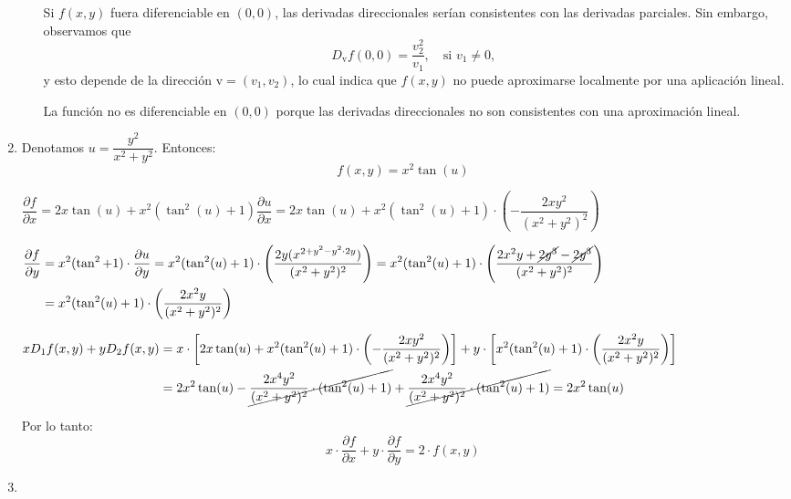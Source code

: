 \begin{enumerate}[label=\c olor{red}\textbf{\arabic*)}, leftmargin=*]
\begin{itemize}
	Si $f(x,y)$ fuera diferenciable en $(0,0)$, las derivadas direccionales serían consistentes con las derivadas parciales. Sin embargo, observamos que \[ D_{\mathrm{v}}f(0,0)=\dfrac{v_2^2}{v_1},\quad\text{si }v_1\neq0, \]y esto depende de la dirección $\mathrm{v}=(v_1,v_2)$, lo cual indica que $f(x,y)$ no puede aproximarse localmente por una aplicación lineal.
	
	La función no es diferenciable en $(0,0)$ porque las derivadas direccionales no son consistentes con una aproximación lineal.
\end{itemize}

\item {}

Denotamos $u=\dfrac{y^{2}}{x^2+y^2}$. Entonces: \[ f(x,y)=x^{2}\tan(u) \]

$\dfrac{\partial f}{\partial x}=2x\tan(u)+x^{2}(\tan^{2}(u)+1)\dfrac{\partial u}{\partial x}=2x\tan(u)+x^{2}(\tan^{2}(u)+1)\cdot\left(-\dfrac{2xy^{2}}{(x^{2}+y^{2})^{2}}\right)$

$\begin{aligned}
\dfrac{\partial f}{\partial y}&=x^{2}(\tan^{2}+1)\cdot\dfrac{\partial u}{\partial y}=x^{2}(\tan^{2}(u)+1)\cdot\left(\dfrac{2y(x^{2+y^{2}-y^{2}\cdot2y})}{(x^{2}+y^{2})^{2}}\right)=x^{2}(\tan^{2}(u)+1)\cdot\left(\dfrac{2x^{2}y+\cancel{2y^{3}}-\cancel{2y^{3}}}{(x^{2}+y^{2})^{2}}\right)\\
&=x^{2}(\tan^{2}(u)+1)\cdot\left(\dfrac{2x^{2}y}{(x^{2}+y^{2})^{2}}\right)
\end{aligned}$

$\begin{aligned}
xD_1f(x,y)+yD_2f(x,y)&=x\cdot\left[2x\tan(u)+x^{2}(\tan^{2}(u)+1)\cdot\left(-\dfrac{2xy^{2}}{(x^{2}+y^{2})^{2}}\right)\right]+y\cdot\left[x^{2}(\tan^{2}(u)+1)\cdot\left(\dfrac{2x^{2}y}{(x^{2}+y^{2})^{2}}\right)\right]\\
&=2x^{2}\tan(u)-\cancel{\dfrac{2x^{4}y^{2}}{(x^{2}+y^{2})^{2}}\cdot(\tan^{2}(u)+1)}+\cancel{\dfrac{2x^{4}y^{2}}{(x^{2}+y^{2})^{2}}\cdot(\tan^{2}(u)+1)} = 2x^{2}\tan(u)
\end{aligned}$

Por lo tanto: \[ x\cdot\dfrac{\partial f}{\partial x}+y\cdot\dfrac{\partial f}{\partial y}=2\cdot f(x,y) \]

\item {}


\end{enumerate}
